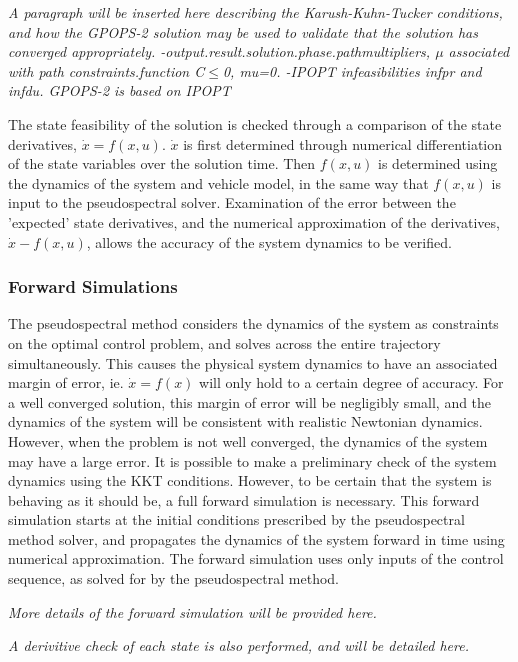 \textit{A paragraph will be inserted here describing the Karush-Kuhn-Tucker conditions, and how the GPOPS-2 solution may be used to validate that the solution has converged appropriately. 
	-output.result.solution.phase.pathmultipliers, $\mu$ associated with path constraints.function C$\le$0, mu=0. 
	-IPOPT infeasibilities infpr and infdu. GPOPS-2 is based on IPOPT}



The state feasibility of the solution is checked through a comparison of the state derivatives, $\dot{x} = f(x,u)$. $\dot{x}$ is first determined through numerical differentiation of the state variables over the solution time. Then $f(x,u)$ is determined using the dynamics of the system and vehicle model, in the same way that $f(x,u)$ is input to the pseudospectral solver. Examination of the error between the 'expected' state derivatives, and the numerical approximation of the derivatives, $\dot{x} - f(x,u)$, allows the accuracy of the system dynamics to be verified. 






\subsubsection{Forward Simulations}


The pseudospectral method considers the dynamics of the system as constraints on the optimal control problem, and solves across the entire trajectory simultaneously. This causes the physical system dynamics to have an associated margin of error, ie. $\dot{x} = f(x)$ will only hold to a certain degree of accuracy. For a well converged solution, this margin of error will be negligibly small, and the dynamics of the system will be consistent with realistic Newtonian dynamics. However, when the problem is not well converged, the dynamics of the system may have a large error. It is possible to make a preliminary check of the system dynamics using the KKT conditions. However, to be certain that the system is behaving as it should be, a full forward simulation is necessary. This forward simulation starts at the initial conditions prescribed by the pseudospectral method solver, and propagates the dynamics of the system forward in time using numerical approximation. The forward simulation uses only inputs of the control sequence, as solved for by the pseudospectral method. 

\textit{More details of the forward simulation will be provided here.}

\textit{A derivitive check of each state is also performed, and will be detailed here.}
